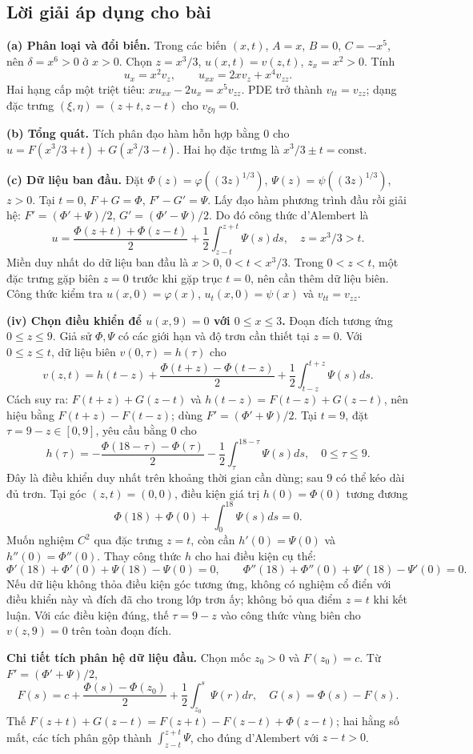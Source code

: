\documentclass[10pt,a4paper]{article}
\begin{document}
\subsection*{Lời giải áp dụng cho bài}
\textbf{(a) Phân loại và đổi biến.} Trong các biến $(x,t)$, $A=x$, $B=0$, $C=-x^5$, nên $\delta=x^6>0$ ở $x>0$. Chọn $z=x^3/3$, $u(x,t)=v(z,t)$, $z_x=x^2>0$. Tính
\[u_x=x^2v_z,\qquad u_{xx}=2xv_z+x^4v_{zz}.\]
Hai hạng cấp một triệt tiêu: $xu_{xx}-2u_x=x^5v_{zz}$. PDE trở thành $v_{tt}=v_{zz}$; dạng đặc trưng $(\xi,\eta)=(z+t,z-t)$ cho $v_{\xi\eta}=0$.

\textbf{(b) Tổng quát.} Tích phân đạo hàm hỗn hợp bằng $0$ cho $u=F(x^3/3+t)+G(x^3/3-t)$. Hai họ đặc trưng là $x^3/3\pm t=\mathrm{const}$.

\textbf{(c) Dữ liệu ban đầu.} Đặt $\Phi(z)=\varphi((3z)^{1/3})$, $\Psi(z)=\psi((3z)^{1/3})$, $z>0$. Tại $t=0$, $F+G=\Phi$, $F'-G'=\Psi$. Lấy đạo hàm phương trình đầu rồi giải hệ: $F'=(\Phi'+\Psi)/2$, $G'=(\Phi'-\Psi)/2$. Do đó công thức d'Alembert là
\[\boxed{u=\frac{\Phi(z+t)+\Phi(z-t)}2+\frac12\int_{z-t}^{z+t}\Psi(s)ds,\quad z=x^3/3>t.}\]
Miền duy nhất do dữ liệu ban đầu là $x>0$, $0<t<x^3/3$. Trong $0<z<t$, một đặc trưng gặp biên $z=0$ trước khi gặp trục $t=0$, nên cần thêm dữ liệu biên. Công thức kiểm tra $u(x,0)=\varphi(x)$, $u_t(x,0)=\psi(x)$ và $v_{tt}=v_{zz}$.

\textbf{(iv) Chọn điều khiển để $u(x,9)=0$ với $0\le x\le3$.} Đoạn đích tương ứng $0\le z\le9$. Giả sử $\Phi,\Psi$ có các giới hạn và độ trơn cần thiết tại $z=0$. Với $0\le z\le t$, dữ liệu biên $v(0,\tau)=h(\tau)$ cho
\[v(z,t)=h(t-z)+\frac{\Phi(t+z)-\Phi(t-z)}2+\frac12\int_{t-z}^{t+z}\Psi(s)ds.\]
Cách suy ra: $F(t+z)+G(z-t)$ và $h(t-z)=F(t-z)+G(z-t)$, nên hiệu bằng $F(t+z)-F(t-z)$; dùng $F'=(\Phi'+\Psi)/2$. Tại $t=9$, đặt $\tau=9-z\in[0,9]$, yêu cầu bằng $0$ cho
\[\boxed{h(\tau)=-\frac{\Phi(18-\tau)-\Phi(\tau)}2-\frac12\int_\tau^{18-\tau}\Psi(s)ds,\quad0\le\tau\le9.}\]
Đây là điều khiển duy nhất trên khoảng thời gian cần dùng; sau $9$ có thể kéo dài đủ trơn. Tại góc $(z,t)=(0,0)$, điều kiện giá trị $h(0)=\Phi(0)$ tương đương
\[\Phi(18)+\Phi(0)+\int_0^{18}\Psi(s)ds=0.\]
Muốn nghiệm $C^2$ qua đặc trưng $z=t$, còn cần $h'(0)=\Psi(0)$ và $h''(0)=\Phi''(0)$. Thay công thức $h$ cho hai điều kiện cụ thể:
\[\Phi'(18)+\Phi'(0)+\Psi(18)-\Psi(0)=0,\qquad
\Phi''(18)+\Phi''(0)+\Psi'(18)-\Psi'(0)=0.\]
Nếu dữ liệu không thỏa điều kiện góc tương ứng, không có nghiệm cổ điển với điều khiển này và đích đã cho trong lớp trơn ấy; không bỏ qua điểm $z=t$ khi kết luận. Với các điều kiện đúng, thế $\tau=9-z$ vào công thức vùng biên cho $v(z,9)=0$ trên toàn đoạn đích.

\textbf{Chi tiết tích phân hệ dữ liệu đầu.} Chọn mốc $z_0>0$ và $F(z_0)=c$. Từ $F'=(\Phi'+\Psi)/2$,
\[F(s)=c+\frac{\Phi(s)-\Phi(z_0)}2+\frac12\int_{z_0}^{s}\Psi(r)dr,\quad G(s)=\Phi(s)-F(s).\]
Thế $F(z+t)+G(z-t)=F(z+t)-F(z-t)+\Phi(z-t)$; hai hằng số mất, các tích phân gộp thành $\int_{z-t}^{z+t}\Psi$, cho đúng d'Alembert với $z-t>0$.
\end{document}
